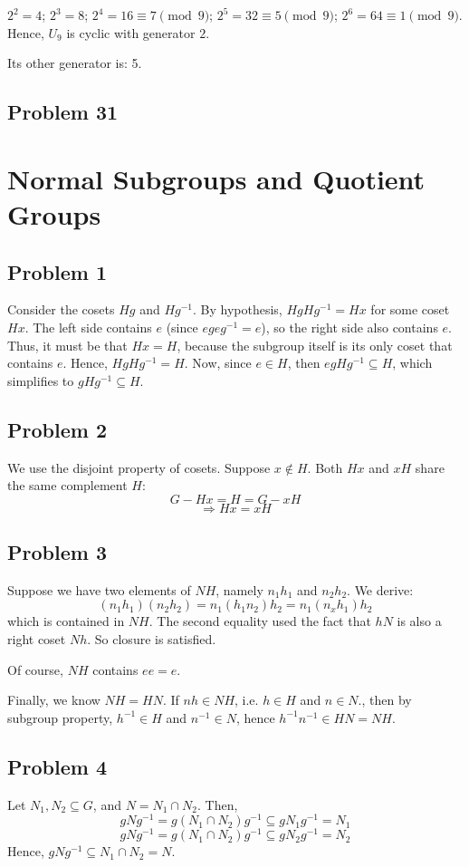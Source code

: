 \documentclass{book}
\begin{document}
$2^2 = 4$; $2^3 = 8$; $2^4 = 16 \equiv 7 \pmod 9$; $2^5 = 32 \equiv 5 \pmod 9$; $2^6 = 64 \equiv 1 \pmod 9$. Hence, $U_9$ is cyclic with generator $2$.

Its other generator is: 5.

\subsection*{Problem 31}


\section{Normal Subgroups and Quotient Groups}

\subsection*{Problem 1}
Consider the cosets $Hg$ and $Hg^{-1}$. By hypothesis, $HgHg^{-1} = Hx$ for some coset $Hx$. The left side contains $e$ (since $egeg^{-1} = e$), so the right side also contains $e$. Thus, it must be that $Hx = H$, because the subgroup itself is its only coset that contains $e$. Hence, $HgHg^{-1} = H$. Now, since $e \in H$, then $egHg^{-1} \subseteq H$, which simplifies to $gHg^{-1} \subseteq H$.

\subsection*{Problem 2}
We use the disjoint property of cosets. Suppose $x \not \in H$. Both $Hx$ and $xH$ share the same complement $H$:
$$G - Hx = H = G - xH$$
$$\Rightarrow Hx = xH$$

\subsection*{Problem 3}
Suppose we have two elements of $NH$, namely $n_1h_1$ and $n_2h_2$. We derive:
$$(n_1h_1)(n_2h_2) = n_1(h_1n_2)h_2 = n_1(n_xh_1)h_2$$
which is contained in $NH$. The second equality used the fact that $hN$ is also a right coset $Nh$. So closure is satisfied.

Of course, $NH$ contains $ee = e$.

Finally, we know $NH = HN$. If $nh \in NH$, i.e. $h \in H$ and $n \in N.$, then by subgroup property, $h^{-1} \in H$ and $n^{-1} \in N$, hence $h^{-1}n^{-1} \in HN = NH$.

\subsection*{Problem 4}
Let $N_1, N_2 \subseteq G$, and $N = N_1 \cap N_2$. Then,
$$gNg^{-1} = g (N_1 \cap N_2) g^{-1} \subseteq gN_1g^{-1} = N_1$$
$$gNg^{-1} = g (N_1 \cap N_2) g^{-1} \subseteq gN_2g^{-1} = N_2$$
Hence, $gNg^{-1} \subseteq N_1 \cap N_2 = N$.
\end{document}
